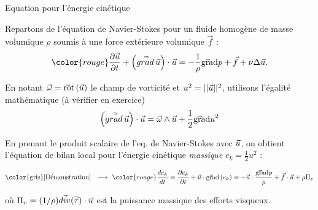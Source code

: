 \begin{frame}{Equation pour l'énergie cinétique}

\small

Repartons de l'équation de Navier-Stokes pour un fluide homogène de masse volumique $\rho$ soumis à une force extérieure volumique $\vec f$ : 
\begin{equation}
	\color{rouge}
  \dpdt{\myvec{u}} + \left( \mytensor{grad} \, \myvec{u} \right) \cdot \myvec{u}
  =
  -\frac{1}{\rho} \gradient p + \vec{f}  + \nu \Delta  \myvec{u}.
\end{equation}

\medskip \pause

En notant $\vec{\omega} = \vec{\mbox{\rm ro}}\mbox{\rm t}\,(\vec{u})$ le champ de vorticité et 
$u^2 = ||\vec{u}||^2$, utilisons l'égalité mathématique (à vérifier en exercice)
\begin{equation*}
 \left( \accentset{\Rightarrow}{grad} \, \vec{u} \right) \cdot \vec{u}
  =
  \vec{\omega} \wedge \vec{u} + \frac{1}{2} \vec{\mbox{\rm gra}}\mbox{\rm d}{u^2}
\end{equation*}

\medskip \pause

En prenant le produit scalaire de l'eq. de Navier-Stokes avec $ \vec{u}$, on obtient
l'équation de bilan local pour l'énergie cinétique {\em massique}
$\displaystyle e_k = \frac{1}{2} u^2$ :

\bigskip

\begin{equation}
  \mbox{\color{gris} [Démonstration] \; $\longrightarrow$ \;}
	\color{rouge}
  \ddt{e_k} = \dpdt{e_k} + \myvec{u}\cdot \gradient \left (e_k\right)
  = 
  - \myvec{u} 
  \cdot \frac{\gradient p}{\rho}  + \vec{f} \cdot \vec{u} + \rho \Pi_v 
\end{equation}

où $\Pi_v = (1/\rho) \vec{div}({\accentset{\Rightarrow}{\tau}}) \cdot \vec{u}$ est la puissance massique des efforts visqueux.

\medskip

\pause


\end{frame}
